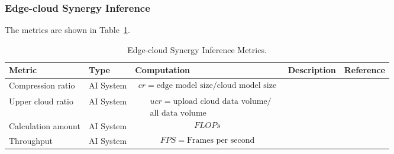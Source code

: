 \subsubsection{Edge-cloud Synergy Inference}

The metrics are shown in Table~\ref{tab:esi}.

\begin{table}[h!]
\caption{Edge-cloud Synergy Inference Metrics.} 
\label{tab:esi}
\begin{tabular}{|p{2cm}|l|p{6cm}|p{3cm}|p{1.5cm}|}

\hline
Metric                 & Type      & Computation & Description                                                                & Reference 
\\ \hline

Compression ratio
& AI System
& 
\parbox{3cm}{
    \begin{equation} \label{equ:cr}
    \begin{split}
cr =  \text{edge model size}  /  \text{cloud model size}
    \end{split} 
    \end{equation} 
}
& 
&      
\\ \hline

Upper cloud ratio
& AI System
& 
\parbox{3cm}{
    \begin{equation} \label{equ:ucr}
    \begin{split} 
& ucr = \text{upload cloud data volume} /  \\
& \text{all data volume} 
    \end{split} 
    \end{equation} 
}
& 
&      
\\ \hline

Calculation amount
& AI System
& 
\parbox{3cm}{
    \begin{equation} \label{equ:flops} 
    \begin{split}
FLOPs
    \end{split} 
    \end{equation} 
}
& 
&      
\\ \hline

Throughput
& AI System
& 
\parbox{3cm}{
    \begin{equation} \label{equ:fps} 
    \begin{split}
FPS =  \text{Frames per second} 
    \end{split} 
    \end{equation} 
}
& 
&      
\\ \hline


\end{tabular}
\end{table}
